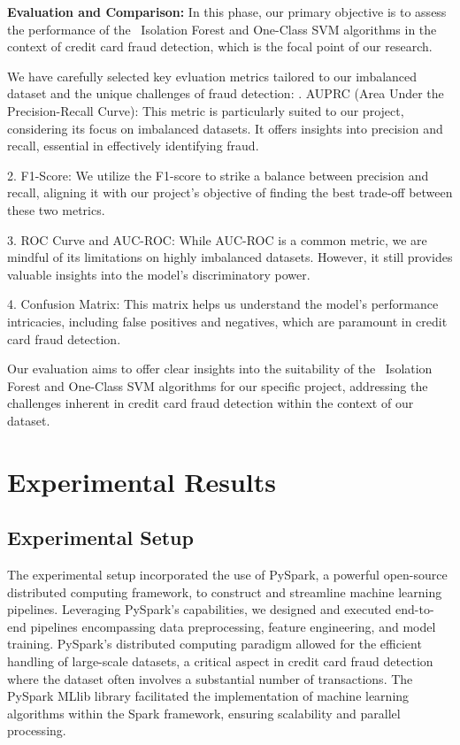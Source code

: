 \documentclass[journal]{IEEEtran}
\begin{document}
\textbf{Evaluation and Comparison:} In this phase, our primary objective is to assess the performance of the ~Isolation Forest and One-Class SVM algorithms in the context of credit card fraud detection, which is the focal point of our research.

We have carefully selected key evluation metrics tailored to our imbalanced dataset and the unique challenges of fraud detection:
. AUPRC\cite{AUPRC} (Area Under the Precision-Recall Curve): This metric is particularly suited to our project, considering its focus on imbalanced datasets. It offers insights into precision and recall, essential in effectively identifying fraud.

2. F1-Score: We utilize the F1-score to strike a balance between precision and recall, aligning it with our project's objective of finding the best trade-off between these two metrics.

3. ROC Curve and AUC-ROC: While AUC-ROC is a common metric, we are mindful of its limitations on highly imbalanced datasets. However, it still provides valuable insights into the model's discriminatory power.

4. Confusion Matrix: This matrix helps us understand the model's performance intricacies, including false positives and negatives, which are paramount in credit card fraud detection.

Our evaluation aims to offer clear insights into the suitability of the ~Isolation Forest and One-Class SVM algorithms for our specific project, addressing the challenges inherent in credit card fraud detection within the context of our dataset.

\section{Experimental Results}

\subsection{Experimental Setup}
The experimental setup incorporated the use of PySpark, a powerful open-source distributed computing framework, to construct and streamline machine learning pipelines. Leveraging PySpark's capabilities, we designed and executed end-to-end pipelines encompassing data preprocessing, feature engineering, and model training. PySpark's distributed computing paradigm allowed for the efficient handling of large-scale datasets, a critical aspect in credit card fraud detection where the dataset often involves a substantial number of transactions. The PySpark MLlib library facilitated the implementation of machine learning algorithms within the Spark framework, ensuring scalability and parallel processing.
\end{document}

